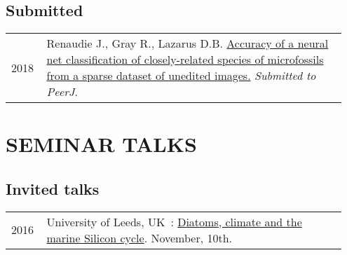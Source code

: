 \documentclass[11pt, a4paper]{article}
\begin{document}
%

\subsection{Submitted}
\begin{longtable}{p{0.1\linewidth} P{0.85\linewidth}}
2018 & Renaudie J., Gray R., Lazarus D.B. \href{https://peerj.com/preprints/27328/}{Accuracy of a neural net classification of closely-related species of microfossils from a sparse dataset of unedited images.} \textit{Submitted to PeerJ}.\\
\end{longtable}

\section{SEMINAR TALKS}
\subsection{Invited talks}
\begin{longtable}{p{0.1\linewidth} P{0.85\linewidth}}
2016 & University of Leeds, UK : \href{http://www.see.leeds.ac.uk/research/iag/geoscience-seminars/event/?SemID=534}{Diatoms, climate and the marine Silicon cycle}. November, 10th.\\
\end{longtable}
\end{document}
